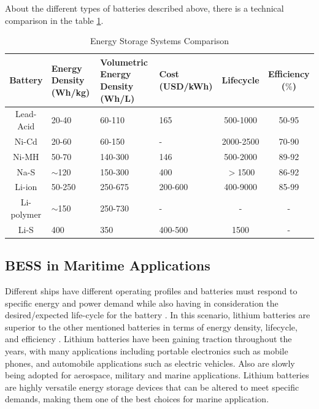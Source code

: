 About the different types of batteries described above, there is a technical comparison in the table \ref{tab:table2}.

\begin{table}[H]
\centering
\caption{Energy Storage Systems Comparison \cite{Chin}}
\label{tab:table2}
\begin{tabular}{cp{20mm}p{28mm}p{20mm}cc}
\hline      \textbf{Battery} & \textbf{Energy Density (Wh/kg)}  & \textbf{Volumetric Energy Density (Wh/L)} & \textbf{Cost (USD/kWh)} & \textbf{Lifecycle} & \textbf{Efficiency ($\%$)}\\
\hline \hline
Lead-Acid    & 20-40 & 60-110 & 165 & 500-1000 & 50-95\\
Ni-Cd        & 20-60 & 60-150 &  -  & 2000-2500 & 70-90\\
Ni-MH        & 50-70 & 140-300 &  146  & 500-2000 & 89-92\\
Na-S         & $\sim$120  & 150-300 &  400  & $>$1500 & 86-92\\
Li-ion       & 50-250  & 250-675 &  200-600  & 400-9000 & 85-99\\
Li-polymer   & $\sim$150  & 250-730 &  -  & - & -\\
Li-S         & 400  & 350 &  400-500  & 1500 & -\\
\hline \hline
\end{tabular}
\end{table}

\subsection{BESS in Maritime Applications}

Different ships have different operating profiles and batteries must respond to specific energy and power demand while also having in consideration the desired/expected life-cycle for the battery \cite{EMSA}. In this scenario, lithium batteries are superior to the other mentioned batteries in terms of energy density, lifecycle, and efficiency \cite{Chin}. Lithium batteries have been gaining traction throughout the years, with many applications including portable electronics such as mobile phones, and automobile applications such as electric vehicles. Also are slowly being adopted for aerospace, military and marine applications. Lithium batteries are highly versatile energy storage devices that can be altered to meet specific demands, making them one of the best choices for marine application.\\

